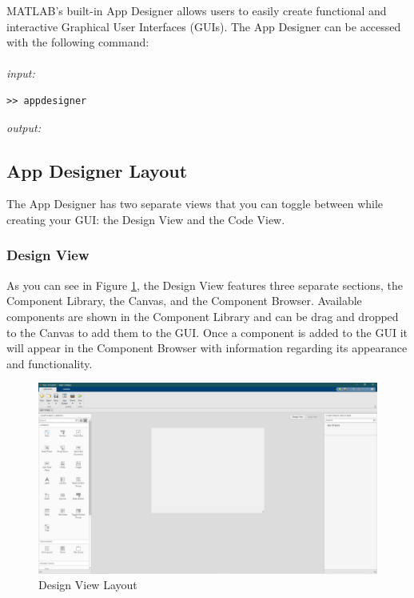 \documentclass[../MATLAB_Primer.tex]{subfiles}
\begin{document}
MATLAB's built-in App Designer allows users to easily create functional and interactive Graphical User Interfaces (GUIs). The App Designer can be accessed with the following command:
\\ \\
\textit{input:}
\begin{lstlisting}
>> appdesigner
\end{lstlisting}
\textit{output:}
\begin{center}

\end{center}

\subsection{App Designer Layout}
The App Designer has two separate views that you can toggle between while creating your GUI: the Design View and the Code View.
\subsubsection{Design View}
As you can see in Figure \ref{fig:designViewLayout}, the Design View features three separate sections, the Component Library, the Canvas, and the Component Browser. Available components are shown in the Component Library and can be drag and dropped to the Canvas to add them to the GUI. Once a component is added to the GUI it will appear in the Component Browser with information regarding its appearance and functionality.
\begin{figure}[H]
    \centering
    \includegraphics[width=426pt]{images/appDesignerDesignViewLayout.PNG}
    \caption{Design View Layout}
    \label{fig:designViewLayout}
\end{figure}
\end{document}
